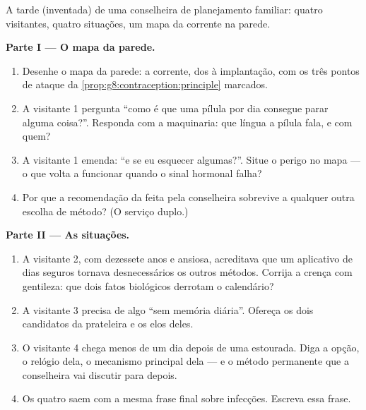 \begin{problem}\label{pb:g8:contraception:1}
A tarde (inventada) de uma conselheira de planejamento familiar:
quatro visitantes, quatro situações, um mapa da corrente na parede.

\medskip\noindent\textbf{Parte I --- O mapa da
parede.}
\begin{enumerate}
  \item Desenhe o mapa da parede: a corrente, dos  à
        implantação, com os três pontos de ataque da
        \cref{prop:g8:contraception:principle} marcados.
  \item A visitante 1 pergunta ``como é que uma pílula por dia
        consegue parar alguma coisa?''. Responda com a maquinaria: que
        língua a pílula fala, e com quem?
  \item A visitante 1 emenda: ``e se eu esquecer algumas?''. Situe o
        perigo no mapa --- o que volta a funcionar quando o sinal
        hormonal falha?
  \item Por que a recomendação da  feita pela conselheira
        sobrevive a qualquer outra escolha de método? (O serviço
        duplo.)
\end{enumerate}

\medskip\noindent\textbf{Parte II --- As situações.}
\begin{enumerate}[resume]
  \item A visitante 2, com dezessete anos e ansiosa, acreditava que
        um aplicativo de dias seguros tornava desnecessários os outros
        métodos. Corrija a crença com gentileza: que dois fatos
        biológicos derrotam o calendário?
  \item A visitante 3 precisa de algo ``sem memória diária''. Ofereça
        os dois candidatos da prateleira e os elos deles.
  \item O visitante 4 chega menos de um dia depois de uma 
        estourada. Diga a opção, o relógio dela, o mecanismo principal
        dela --- e o método permanente que a conselheira vai discutir
        para depois.
  \item Os quatro saem com a mesma frase final sobre infecções.
        Escreva essa frase.
\end{enumerate}


\end{problem}
